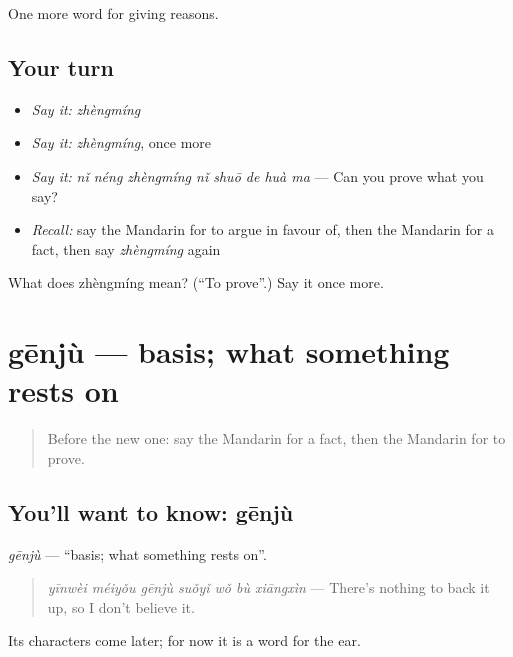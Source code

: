 \begin{grammarlens}[title={What you've built}]
One more word for giving reasons.
\end{grammarlens}

\subsection*{Your turn}
\begin{itemize}
\raggedright
  \item \emph{Say it:} \emph{zhèngmíng}
  \item \emph{Say it:} \emph{zhèngmíng}, once more
  \item \emph{Say it:} \emph{nǐ néng zhèngmíng nǐ shuō de huà ma} — Can you prove what you say?
  \item \emph{Recall:} say the Mandarin for to argue in favour of, then the Mandarin for a fact, then say \emph{zhèngmíng} again
\end{itemize}

\begin{tcolorbox}[breakable,colback=teal!4,colframe=teal!35!black,title={Before you move on}]
What does zhèngmíng mean? (\textquotedblleft{}To prove\textquotedblright{}.) Say it once more.
\end{tcolorbox}
\section[gēnjù]{gēnjù — basis; what something rests on}

\label{lesson:ZH-C350-genju}



\begin{quote}
Before the new one: say the Mandarin for a fact, then the Mandarin for to prove.
\end{quote}

\subsection*{You'll want to know: gēnjù}
\emph{gēnjù} — \textquotedblleft{}basis; what something rests on\textquotedblright{}.

\begin{quote}
\emph{yīnwèi méiyǒu gēnjù suǒyǐ wǒ bù xiāngxìn} — There's nothing to back it up, so I don't believe it.
\end{quote}

Its characters come later; for now it is a word for the ear.

